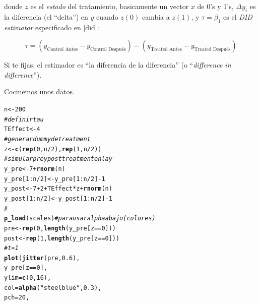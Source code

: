 \documentclass[onesided]{article}\usepackage[]{graphicx}\usepackage[]{color}
\makeatletter
\newcommand{\hlnum}[1]{\textcolor[rgb]{0.686,0.059,0.569}{#1}}%
\newcommand{\hlstr}[1]{\textcolor[rgb]{0.192,0.494,0.8}{#1}}%
\newcommand{\hlcom}[1]{\textcolor[rgb]{0.678,0.584,0.686}{\textit{#1}}}%
\newcommand{\hlopt}[1]{\textcolor[rgb]{0,0,0}{#1}}%
\newcommand{\hlstd}[1]{\textcolor[rgb]{0.345,0.345,0.345}{#1}}%
\newcommand{\hlkwb}[1]{\textcolor[rgb]{0.69,0.353,0.396}{#1}}%
\newcommand{\hlkwc}[1]{\textcolor[rgb]{0.333,0.667,0.333}{#1}}%
\newcommand{\hlkwd}[1]{\textcolor[rgb]{0.737,0.353,0.396}{\textbf{#1}}}%
\newenvironment{kframe}{%
 \def\at@end@of@kframe{}%
 \ifinner\ifhmode%
  \def\at@end@of@kframe{\end{minipage}}%
  \begin{minipage}{\columnwidth}%
 \fi\fi%
 \def\FrameCommand##1{\hskip\@totalleftmargin \hskip-\fboxsep
 \colorbox{shadecolor}{##1}\hskip-\fboxsep
     \hskip-\linewidth \hskip-\@totalleftmargin \hskip\columnwidth}%
 \MakeFramed {\advance\hsize-\width
   \@totalleftmargin\z@ \linewidth\hsize
   \@setminipage}}%
 {\par\unskip\endMakeFramed%
 \at@end@of@kframe}
\newenvironment{knitrout}{}{} %
\makeatother
\begin{document}
donde $z$ es el \emph{estado} del tratamiento, basicamente un vector $x$ de 0's y 1's, $\Delta y_{i}$ es la diferencia (el ``delta'') en $y$ cuando $z(0)$ cambia a $z(1)$, y $\tau=\beta_{1}$ es el \emph{DID estimator} especificado en \autoref{did}:


\begin{equation}\label{did}
\tau = (y_{\text{Control Antes}}-y_{\text{Control Despu\'es}}) - (y_{\text{Treated Antes}}-y_{\text{Treated Despu\'es}})
\end{equation}

Si te fijas, el estimador es ``la diferencia de la diferencia'' (o ``\emph{difference in difference}'').


Cocinemos unos datos.

\begin{knitrout}
\color{fgcolor}\begin{kframe}
\begin{alltt}
\hlstd{n} \hlkwb{<-} \hlnum{200}
\hlcom{# definir tau}
\hlstd{TEffect} \hlkwb{<-} \hlnum{4}
\hlcom{# generar dummy de treatment }
\hlstd{z} \hlkwb{<-} \hlkwd{c}\hlstd{(}\hlkwd{rep}\hlstd{(}\hlnum{0}\hlstd{, n}\hlopt{/}\hlnum{2}\hlstd{),} \hlkwd{rep}\hlstd{(}\hlnum{1}\hlstd{, n}\hlopt{/}\hlnum{2}\hlstd{))}
\hlcom{# simular pre y post treatment en la y}
\hlstd{y_pre} \hlkwb{<-} \hlnum{7} \hlopt{+} \hlkwd{rnorm}\hlstd{(n)}
\hlstd{y_pre[}\hlnum{1}\hlopt{:}\hlstd{n}\hlopt{/}\hlnum{2}\hlstd{]} \hlkwb{<-} \hlstd{y_pre[}\hlnum{1}\hlopt{:}\hlstd{n}\hlopt{/}\hlnum{2}\hlstd{]} \hlopt{-} \hlnum{1}
\hlstd{y_post} \hlkwb{<-} \hlnum{7} \hlopt{+} \hlnum{2} \hlopt{+} \hlstd{TEffect} \hlopt{*} \hlstd{z} \hlopt{+} \hlkwd{rnorm}\hlstd{(n)}
\hlstd{y_post[}\hlnum{1}\hlopt{:}\hlstd{n}\hlopt{/}\hlnum{2}\hlstd{]} \hlkwb{<-} \hlstd{y_post[}\hlnum{1}\hlopt{:}\hlstd{n}\hlopt{/}\hlnum{2}\hlstd{]} \hlopt{-} \hlnum{1}
\hlcom{#}
\hlkwd{p_load}\hlstd{(scales)} \hlcom{# para usar alpha abajo (colores)}
\hlstd{pre} \hlkwb{<-} \hlkwd{rep}\hlstd{(}\hlnum{0}\hlstd{,} \hlkwd{length}\hlstd{(y_pre[z}\hlopt{==}\hlnum{0}\hlstd{]))}
\hlstd{post} \hlkwb{<-} \hlkwd{rep}\hlstd{(}\hlnum{1}\hlstd{,} \hlkwd{length}\hlstd{(y_pre[z}\hlopt{==}\hlnum{0}\hlstd{]))}
\hlcom{# t=1}
\hlkwd{plot}\hlstd{(}\hlkwd{jitter}\hlstd{(pre,} \hlnum{0.6}\hlstd{),}
     \hlstd{y_pre[z} \hlopt{==} \hlnum{0}\hlstd{],}
     \hlkwc{ylim} \hlstd{=} \hlkwd{c}\hlstd{(}\hlnum{0}\hlstd{,} \hlnum{16}\hlstd{),}
     \hlkwc{col} \hlstd{=} \hlkwd{alpha}\hlstd{(}\hlstr{"steelblue"}\hlstd{,} \hlnum{0.3}\hlstd{),}
     \hlkwc{pch} \hlstd{=} \hlnum{20}\hlstd{,}

\end{alltt}
\end{kframe}
\end{knitrout}
\end{document}
